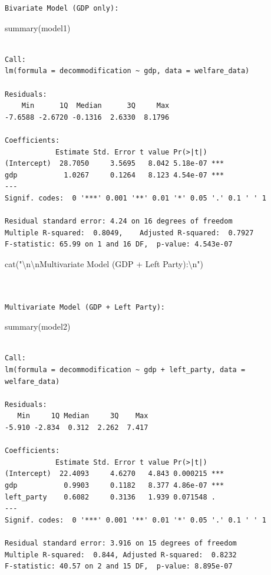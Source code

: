 \documentclass[
  letterpaper,
  DIV=11,
  numbers=noendperiod]{scrreprt}
\newenvironment{Shaded}{\begin{snugshade}}{\end{snugshade}}
\newcommand{\FunctionTok}[1]{\textcolor[rgb]{0.28,0.35,0.67}{#1}}
\newcommand{\NormalTok}[1]{\textcolor[rgb]{0.00,0.23,0.31}{#1}}
\newcommand{\SpecialCharTok}[1]{\textcolor[rgb]{0.37,0.37,0.37}{#1}}
\newcommand{\StringTok}[1]{\textcolor[rgb]{0.13,0.47,0.30}{#1}}
\begin{document}
\begin{verbatim}
Bivariate Model (GDP only):
\end{verbatim}

\begin{Shaded}
\begin{Highlighting}[]
\FunctionTok{summary}\NormalTok{(model1)}
\end{Highlighting}
\end{Shaded}

\begin{verbatim}

Call:
lm(formula = decommodification ~ gdp, data = welfare_data)

Residuals:
    Min      1Q  Median      3Q     Max 
-7.6588 -2.6720 -0.1316  2.6330  8.1796 

Coefficients:
            Estimate Std. Error t value Pr(>|t|)    
(Intercept)  28.7050     3.5695   8.042 5.18e-07 ***
gdp           1.0267     0.1264   8.123 4.54e-07 ***
---
Signif. codes:  0 '***' 0.001 '**' 0.01 '*' 0.05 '.' 0.1 ' ' 1

Residual standard error: 4.24 on 16 degrees of freedom
Multiple R-squared:  0.8049,    Adjusted R-squared:  0.7927 
F-statistic: 65.99 on 1 and 16 DF,  p-value: 4.543e-07
\end{verbatim}

\begin{Shaded}
\begin{Highlighting}[]
\FunctionTok{cat}\NormalTok{(}\StringTok{"}\SpecialCharTok{\textbackslash{}n\textbackslash{}n}\StringTok{Multivariate Model (GDP + Left Party):}\SpecialCharTok{\textbackslash{}n}\StringTok{"}\NormalTok{)}
\end{Highlighting}
\end{Shaded}

\begin{verbatim}


Multivariate Model (GDP + Left Party):
\end{verbatim}

\begin{Shaded}
\begin{Highlighting}[]
\FunctionTok{summary}\NormalTok{(model2)}
\end{Highlighting}
\end{Shaded}

\begin{verbatim}

Call:
lm(formula = decommodification ~ gdp + left_party, data = welfare_data)

Residuals:
   Min     1Q Median     3Q    Max 
-5.910 -2.834  0.312  2.262  7.417 

Coefficients:
            Estimate Std. Error t value Pr(>|t|)    
(Intercept)  22.4093     4.6270   4.843 0.000215 ***
gdp           0.9903     0.1182   8.377 4.86e-07 ***
left_party    0.6082     0.3136   1.939 0.071548 .  
---
Signif. codes:  0 '***' 0.001 '**' 0.01 '*' 0.05 '.' 0.1 ' ' 1

Residual standard error: 3.916 on 15 degrees of freedom
Multiple R-squared:  0.844, Adjusted R-squared:  0.8232 
F-statistic: 40.57 on 2 and 15 DF,  p-value: 8.895e-07
\end{verbatim}
\end{document}
